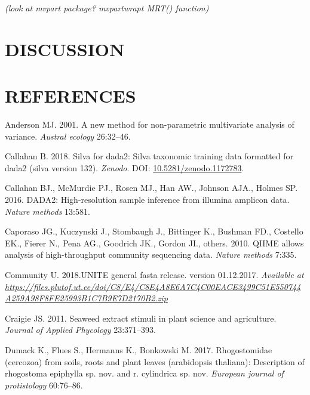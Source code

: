 \documentclass[11pt,]{article}
\begin{document}
\emph{(look at mvpart package? mvpartwrapt MRT() function)}

\newpage  

\section{DISCUSSION}\label{discussion}

\newpage  

\section*{REFERENCES}\label{references}

\hypertarget{refs}{}
\hypertarget{ref-anderson2001new}{}
Anderson MJ. 2001. A new method for non-parametric multivariate analysis
of variance. \emph{Austral ecology} 26:32--46.

\hypertarget{ref-silva}{}
Callahan B. 2018. Silva for dada2: Silva taxonomic training data
formatted for dada2 (silva version 132). \emph{Zenodo}. DOI:
\href{https://doi.org/10.5281/zenodo.1172783}{10.5281/zenodo.1172783}.

\hypertarget{ref-callahan2016dada2}{}
Callahan BJ., McMurdie PJ., Rosen MJ., Han AW., Johnson AJA., Holmes SP.
2016. DADA2: High-resolution sample inference from illumina amplicon
data. \emph{Nature methods} 13:581.

\hypertarget{ref-caporaso2010qiime}{}
Caporaso JG., Kuczynski J., Stombaugh J., Bittinger K., Bushman FD.,
Costello EK., Fierer N., Pena AG., Goodrich JK., Gordon JI., others.
2010. QIIME allows analysis of high-throughput community sequencing
data. \emph{Nature methods} 7:335.

\hypertarget{ref-UNITE2017}{}
Community U. 2018.UNITE general fasta release. version 01.12.2017.
\emph{Available at}
\emph{\url{https://files.plutof.ut.ee/doi/C8/E4/C8E4A8E6A7C4C00EACE3499C51E550744A259A98F8FE25993B1C7B9E7D2170B2.zip}}

\hypertarget{ref-craigie2011seaweed}{}
Craigie JS. 2011. Seaweed extract stimuli in plant science and
agriculture. \emph{Journal of Applied Phycology} 23:371--393.

\hypertarget{ref-dumack2017rhogostomidae}{}
Dumack K., Flues S., Hermanns K., Bonkowski M. 2017. Rhogostomidae
(cercozoa) from soils, roots and plant leaves (arabidopsis thaliana):
Description of rhogostoma epiphylla sp. nov. and r. cylindrica sp. nov.
\emph{European journal of protistology} 60:76--86.
\end{document}

